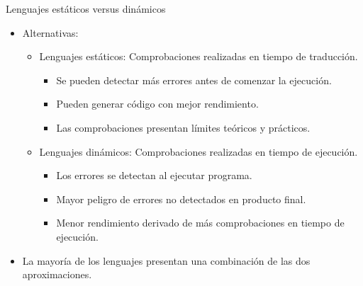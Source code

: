 \begin{frame}{Lenguajes estáticos versus dinámicos}
\begin{itemize}
  \item Alternativas:
    \begin{itemize}
      \item \alert{Lenguajes estáticos}: Comprobaciones realizadas en tiempo de traducción.
        \begin{itemize}
          \item Se pueden detectar más errores antes de comenzar la ejecución.
          \item Pueden generar código con mejor rendimiento.
          \item Las comprobaciones presentan límites teóricos y prácticos.
        \end{itemize}
      \item \alert{Lenguajes dinámicos}: Comprobaciones realizadas en tiempo de ejecución.
        \begin{itemize}
          \item Los errores se detectan al ejecutar programa.
          \item Mayor peligro de errores no detectados en producto final.
          \item Menor rendimiento derivado de más comprobaciones en tiempo de ejecución.
        \end{itemize}
    \end{itemize}
  \item La mayoría de los lenguajes presentan una combinación de las dos aproximaciones.
\end{itemize}
\end{frame}

